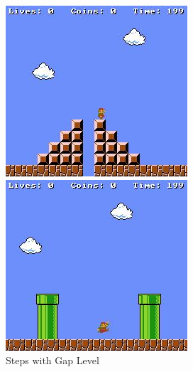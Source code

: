 \documentclass[notitlepage,a4paper,11pt]{article}
\begin{document}
	\begin{figure}[!htb]
  \includegraphics[width=\linewidth]{figs/steps_gap_level.png}
  \caption{Steps with Gap Level}\label{fig:steps_gap_level}
\endminipage\hfill
{}
  \includegraphics[width=\linewidth]{figs/two_pipe_level.png}

\end{figure}
\end{document}
